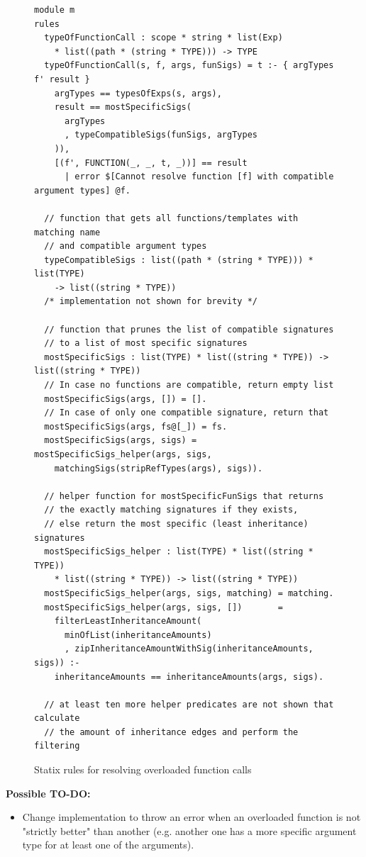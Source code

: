     \begin{figure}
      \begin{verbatim}
module m
rules
  typeOfFunctionCall : scope * string * list(Exp) 
    * list((path * (string * TYPE))) -> TYPE
  typeOfFunctionCall(s, f, args, funSigs) = t :- { argTypes f' result }
    argTypes == typesOfExps(s, args),
    result == mostSpecificSigs(
      argTypes
      , typeCompatibleSigs(funSigs, argTypes
    )),
    [(f', FUNCTION(_, _, t, _))] == result
      | error $[Cannot resolve function [f] with compatible argument types] @f.

  // function that gets all functions/templates with matching name
  // and compatible argument types
  typeCompatibleSigs : list((path * (string * TYPE))) * list(TYPE)
    -> list((string * TYPE))
  /* implementation not shown for brevity */
    
  // function that prunes the list of compatible signatures
  // to a list of most specific signatures
  mostSpecificSigs : list(TYPE) * list((string * TYPE)) -> list((string * TYPE))
  // In case no functions are compatible, return empty list
  mostSpecificSigs(args, []) = [].
  // In case of only one compatible signature, return that
  mostSpecificSigs(args, fs@[_]) = fs.
  mostSpecificSigs(args, sigs) = mostSpecificSigs_helper(args, sigs, 
    matchingSigs(stripRefTypes(args), sigs)).

  // helper function for mostSpecificFunSigs that returns
  // the exactly matching signatures if they exists,
  // else return the most specific (least inheritance) signatures
  mostSpecificSigs_helper : list(TYPE) * list((string * TYPE))
    * list((string * TYPE)) -> list((string * TYPE))
  mostSpecificSigs_helper(args, sigs, matching) = matching.
  mostSpecificSigs_helper(args, sigs, [])       = 
    filterLeastInheritanceAmount(
      minOfList(inheritanceAmounts) 
      , zipInheritanceAmountWithSig(inheritanceAmounts, sigs)) :-
    inheritanceAmounts == inheritanceAmounts(args, sigs).
  
  // at least ten more helper predicates are not shown that calculate
  // the amount of inheritance edges and perform the filtering
      \end{verbatim}
      \caption{\label{fig:statix-overloaded-function-calls}Statix rules for resolving overloaded function calls}
    \end{figure}

    \textbf{Possible TO-DO:}
    \begin{itemize}
      \item Change implementation to throw an error when an overloaded function is not "strictly better" than another (e.g. another one has a more specific argument type for at least one of the arguments).
    \end{itemize}

